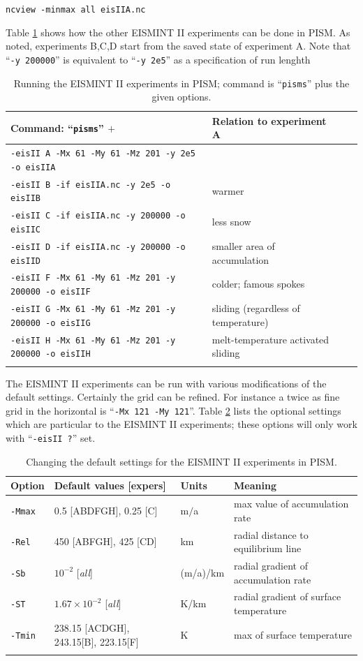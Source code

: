 \documentclass[11pt,final]{amsart}
\renewcommand{\t}[1]{\texttt{#1}}
\begin{document}
\verb|ncview -minmax all eisIIA.nc|

Table \ref{tab:eisII} shows how the other EISMINT II experiments can be done in PISM.  As noted, experiments B,C,D start from the saved state of experiment A.  Note that ``\t{-y 200000}'' is equivalent to ``\t{-y 2e5}'' as a specification of run lenghth

\begin{table}[h]
\caption{Running the EISMINT II experiments in PISM; command is ``\t{pisms}'' plus the given options.}\label{tab:eisII}
\small
\begin{tabular}{@{}llll}\hline
\textbf{Command: ``\t{pisms}'' $+$} & \textbf{Relation to experiment A} \\ \hline
\verb|-eisII A -Mx 61 -My 61 -Mz 201 -y 2e5 -o eisIIA| & \\
\verb|-eisII B -if eisIIA.nc -y 2e5 -o eisIIB| & warmer \\
\verb|-eisII C -if eisIIA.nc -y 200000 -o eisIIC| & less snow \\
\verb|-eisII D -if eisIIA.nc -y 200000 -o eisIID| & smaller area of accumulation \\
\verb|-eisII F -Mx 61 -My 61 -Mz 201 -y 200000 -o eisIIF| & colder; famous spokes \cite{BBL} \\
\verb|-eisII G -Mx 61 -My 61 -Mz 201 -y 200000 -o eisIIG| & sliding (regardless of temperature) \\
\verb|-eisII H -Mx 61 -My 61 -Mz 201 -y 200000 -o eisIIH| & melt-temperature activated sliding \\
\hline\normalsize
\end{tabular}\end{table}

The EISMINT II experiments can be run with various modifications of the default settings.  Certainly the grid can be refined.  For instance a twice as fine grid in the horizontal is ``\t{-Mx 121 -My 121}''.  Table \ref{tab:eisIIoptions} lists the optional settings which are particular to the EISMINT II experiments; these options will only work with ``\t{-eisII ?}'' set.

\begin{table}[h]
\caption{Changing the default settings for the EISMINT II experiments in PISM.}\label{tab:eisIIoptions}
\small
\begin{tabular}{@{}llll}\hline
\textbf{Option} & \textbf{Default values [expers]} & \textbf{Units} & \textbf{Meaning} \\ \hline
\verb|-Mmax| & 0.5 [ABDFGH], 0.25 [C] & m$/$a & max value of accumulation rate \\
\verb|-Rel| & 450 [ABFGH], 425 [CD] & km & radial distance to equilibrium line \\
\verb|-Sb| & $10^{-2}$ [\emph{all}] & (m/a)/km & radial gradient of accumulation rate \\
\verb|-ST| & $1.67 \times 10^{-2}$ [\emph{all}] & K/km & radial gradient of surface temperature\\
\verb|-Tmin| & 238.15 [ACDGH], 243.15[B], 223.15[F] & K & max of surface temperature \\
\hline\normalsize
\end{tabular}\end{table}
\end{document}
